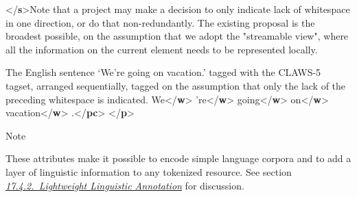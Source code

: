 \begin{reflist}
\begin{sansreflist}
\begin{reflist}
{</\textbf{s}>}Note that a project may make a decision to only indicate lack of whitespace in one direction, or do that non-redundantly. The existing proposal is the broadest possible, on the assumption that we adopt the "streamable view", where all the information on the current element needs to be represented locally.
    \item[]The English sentence ‘We're going on vacation.’ tagged with the CLAWS-5 tagset, arranged sequentially, tagged on the assumption that only the lack of the preceding whitespace is indicated.\mbox{}\newline 
{}We{</\textbf{w}>}\mbox{}\newline 
{}'re{</\textbf{w}>}\mbox{}\newline 
{}going{</\textbf{w}>}\mbox{}\newline 
{}on{</\textbf{w}>}\mbox{}\newline 
{}vacation{</\textbf{w}>}\mbox{}\newline 
{}.{</\textbf{pc}>}\mbox{}\newline 
{</\textbf{p}>}
\end{reflist}  
\end{sansreflist}  
    \item[{Note}]
  \par
These attributes make it possible to encode simple language corpora and to add a layer of linguistic information to any tokenized resource. See section \textit{\hyperref[AILALW]{17.4.2.\ Lightweight Linguistic Annotation}} for discussion.
\end{reflist}  
